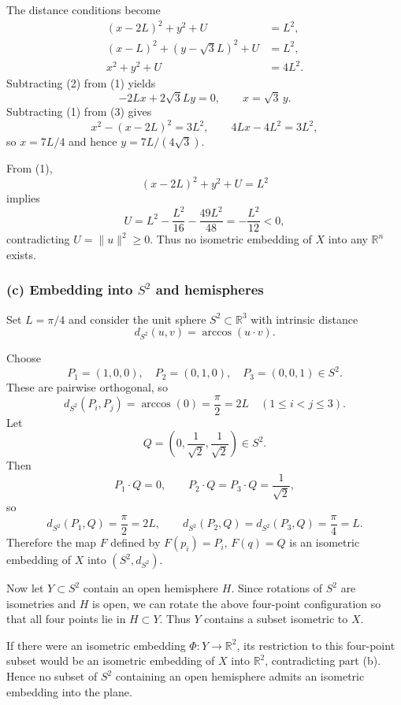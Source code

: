 \documentclass[12pt,a4paper]{article}
\theoremstyle{plain}
\theoremstyle{definition}      %
\begin{document}
	The distance conditions become
	\begin{align*}
		(x-2L)^2+y^2+U &= L^2, \tag{1}\\
		(x-L)^2+(y-\sqrt{3}L)^2+U &= L^2, \tag{2}\\
		x^2+y^2+U &= 4L^2. \tag{3}
	\end{align*}
	Subtracting \textnormal{(2)} from \textnormal{(1)} yields
	\[
	-2Lx+2\sqrt{3}Ly=0,\qquad x=\sqrt{3}\,y.
	\]
	Subtracting \textnormal{(1)} from \textnormal{(3)} gives
	\[
	x^2-(x-2L)^2=3L^2,\qquad 4Lx-4L^2=3L^2,
	\]
	so $x=7L/4$ and hence $y=7L/(4\sqrt{3})$.
	
	From \textnormal{(1)},
	\[
	(x-2L)^2+y^2+U=L^2
	\]
	implies
	\[
	U = L^2 - \frac{L^2}{16}-\frac{49L^2}{48}
	= -\frac{L^2}{12}<0,
	\]
	contradicting $U=\|u\|^2\ge0$.  Thus no isometric embedding of $X$ into any
	$\mathbb{R}^n$ exists.
	
	\subsubsection*{(c) Embedding into $S^2$ and hemispheres}
	
	Set $L=\pi/4$ and consider the unit sphere $S^2\subset\mathbb{R}^3$ with
	intrinsic distance
	\[
	d_{S^2}(u,v)=\arccos(u\cdot v).
	\]
	
	Choose
	\[
	P_1=(1,0,0),\quad P_2=(0,1,0),\quad P_3=(0,0,1)\in S^2.
	\]
	These are pairwise orthogonal, so
	\[
	d_{S^2}(P_i,P_j)=\arccos(0)=\frac{\pi}{2}=2L
	\quad (1\le i<j\le 3).
	\]
	Let
	\[
	Q=\left(0,\frac{1}{\sqrt{2}},\frac{1}{\sqrt{2}}\right)\in S^2.
	\]
	Then
	\[
	P_1\cdot Q=0,\qquad
	P_2\cdot Q=P_3\cdot Q=\frac{1}{\sqrt{2}},
	\]
	so
	\[
	d_{S^2}(P_1,Q)=\frac{\pi}{2}=2L,\qquad
	d_{S^2}(P_2,Q)=d_{S^2}(P_3,Q)=\frac{\pi}{4}=L.
	\]
	Therefore the map $F$ defined by $F(p_i)=P_i$, $F(q)=Q$ is an isometric
	embedding of $X$ into $(S^2,d_{S^2})$.
	
	Now let $Y\subset S^2$ contain an open hemisphere $H$.  Since rotations of
	$S^2$ are isometries and $H$ is open, we can rotate the above four-point
	configuration so that all four points lie in $H\subset Y$.  Thus $Y$
	contains a subset isometric to $X$.
	
	If there were an isometric embedding $\Phi:Y\to\mathbb{R}^2$, its restriction
	to this four-point subset would be an isometric embedding of $X$ into
	$\mathbb{R}^2$, contradicting part \textnormal{(b)}.  Hence no subset of $S^2$
	containing an open hemisphere admits an isometric embedding into the plane.
	\qedhere
	
\end{document}
